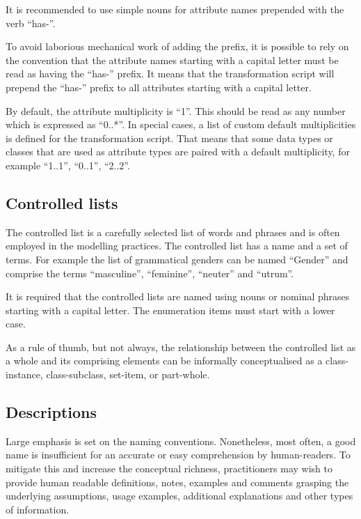 	It is recommended to use simple nouns for attribute names prepended with the verb ``has-''.
	
	To avoid laborious mechanical work of adding the prefix, it is possible to rely on the convention that the attribute names starting with a capital letter must be read as having the ``has-'' prefix. It means that the transformation script will prepend the ``has-'' prefix to all attributes starting with a capital letter.
	
	By default, the attribute multiplicity is ``1''. This should be read as any number which is expressed as ``0..*''. In special cases, a list of custom default multiplicities is defined for the transformation script. That means that some data types or classes that are used as attribute types are paired with a default multiplicity, for example ``1..1'', ``0..1'', ``2..2''. 
	
	\subsection{Controlled lists}
	\label{sec:controlled-list}
	
	The controlled list is a carefully selected list of words and phrases and is often employed in the modelling practices. The controlled list has a name and a set of terms. For example the list of grammatical genders can be named ``Gender'' and comprise the terms ``masculine'', ``feminine'', ``neuter'' and ``utrum''. 
	
	It is required that the controlled lists are named using nouns or nominal phrases starting with a capital letter. The enumeration items must start with a lower case. 
	
	As a rule of thumb, but not always, the relationship between the controlled list as a whole and its comprising elements can be informally conceptualised as a class-instance, class-subclass, set-item, or part-whole.
	
	\subsection{Descriptions}
	\label{sec:descriptions}
	
	Large emphasis is set on the naming conventions. Nonetheless, most often, a good name is insufficient for an accurate or easy comprehension by human-readers. To mitigate this and increase the conceptual richness, practitioners may wish to provide human readable definitions, notes, examples and comments grasping the underlying assumptions, usage examples, additional explanations and other types of information. 
	

